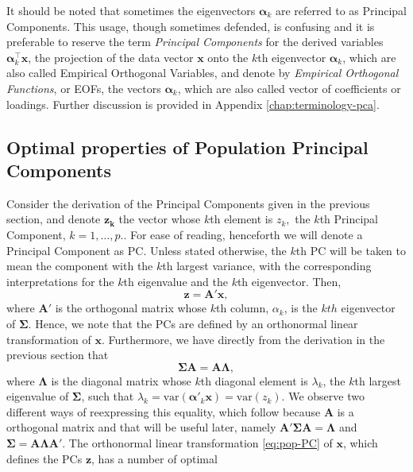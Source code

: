 \documentclass[11pt, oneside]{book}
\theoremstyle{plain}
\theoremstyle{remark}
\begin{document}
It should be noted that sometimes the eigenvectors $\bm{\alpha}_k$ are referred
to as Principal Components. This usage, though sometimes defended, is confusing
and it is preferable to reserve the term \emph{Principal Components} for the
derived variables $\bm{\alpha}_k^\top\mathbf{x}$, the projection of the data
vector $\mathbf{x}$ onto the $k$th eigenvector $\bm{\alpha}_k$,  which are also
called Empirical Orthogonal Variables, and denote by \emph{Empirical Orthogonal
Functions}, or EOFs, the vectors $\bm{\alpha}_k$, which are also called vector
of coefficients or loadings. Further discussion is provided in Appendix
\ref{chap:terminology-pca}.

\subsection{Optimal properties of Population Principal
    Components}\label{sec:optprop-pop}
Consider the derivation of the Principal Components given in the previous
section, and denote $\mathbf{z_k}$ the vector whose $k$th element is $z_k,$ the
$k$th Principal Component, $k=1,\dots,p.$. For ease of reading, henceforth we
will denote a Principal Component as PC.  Unless stated otherwise, the $k$th PC
will be taken to mean the component with the $k$th largest variance, with the
corresponding interpretations for the $k$th eigenvalue and the $k$th
eigenvector. Then, 
\begin{equation}\label{eq:pop-PC}
    \mathbf{z} = \mathbf{A'x},
\end{equation}
where $\mathbf{A'}$ is the orthogonal matrix whose $k$th column, $\alpha_k$, is
the $kth$ eigenvector of $\mathbf{\Sigma}.$ Hence, we note that the PCs are
defined by an orthonormal linear transformation of $\mathbf{x}$. Furthermore, we
have directly from the derivation in the previous section that 
\begin{equation}\label{eq:diag_sigma}
    \mathbf{\Sigma A}=\mathbf{A\Lambda},
\end{equation}
where $\mathbf{\Lambda}$ is the diagonal matrix whose
$k$th diagonal element is $\lambda_k$, the $k$th largest eigenvalue of
$\mathbf{\Sigma}$, such that $\lambda_k = \text{var}(\bm{\alpha'}_k\mathbf{x}) =
\text{var}(z_k).$ We observe two different ways of reexpressing this equality,
which follow because $\mathbf{A}$ is a orthogonal matrix and that will be useful
later, namely $\mathbf{A'\Sigma A} = \mathbf{\Lambda}$ and $\bm{\Sigma} =
\mathbf{A\Lambda A'}.$ The orthonormal linear transformation \eqref{eq:pop-PC}
of $\mathbf{x}$, which defines the PCs $\mathbf{z}$, has a number of optimal
\end{document}
